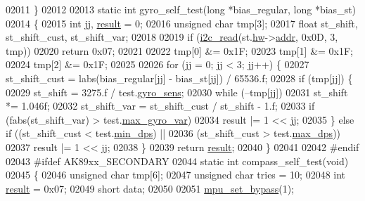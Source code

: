 \begin{DoxyCode}
{{{{{{{02011 \}
02012 
02013 \textcolor{keyword}{static} \textcolor{keywordtype}{int} gyro\_self\_test(\textcolor{keywordtype}{long} *bias\_regular, \textcolor{keywordtype}{long} *bias\_st)
02014 \{
02015     \textcolor{keywordtype}{int} jj, \hyperlink{sensor_8h_a4c9d9cb8bb9d2b707a152051408f40e5}{result} = 0;
02016     \textcolor{keywordtype}{unsigned} \textcolor{keywordtype}{char} tmp[3];
02017     \textcolor{keywordtype}{float} st\_shift, st\_shift\_cust, st\_shift\_var;
02018 
02019     \textcolor{keywordflow}{if} (\hyperlink{_i2_c_8c_ac2d47e7a6c76f93f9b537c31a2986e7b}{i2c\_read}(st.\hyperlink{structgyro__state__s_a5bac30a96752691e4cc723735060e360}{hw}->\hyperlink{structhw__s_a4c34a946600e9d68b6355d23f54d291b}{addr}, 0x0D, 3, tmp))
02020         \textcolor{keywordflow}{return} 0x07;
02021 
02022     tmp[0] &= 0x1F;
02023     tmp[1] &= 0x1F;
02024     tmp[2] &= 0x1F;
02025 
02026     \textcolor{keywordflow}{for} (jj = 0; jj < 3; jj++) \{
02027         st\_shift\_cust = labs(bias\_regular[jj] - bias\_st[jj]) / 65536.f;
02028         \textcolor{keywordflow}{if} (tmp[jj]) \{
02029             st\_shift = 3275.f / test.\hyperlink{structtest__s_a32da1174cf6569aa99bdff70055bb45a}{gyro\_sens};
02030             \textcolor{keywordflow}{while} (--tmp[jj])
02031                 st\_shift *= 1.046f;
02032             st\_shift\_var = st\_shift\_cust / st\_shift - 1.f;
02033             \textcolor{keywordflow}{if} (fabs(st\_shift\_var) > test.\hyperlink{structtest__s_a629a75454f5af8caaff2fe8388975d32}{max\_gyro\_var})
02034                 result |= 1 << jj;
02035         \} \textcolor{keywordflow}{else} \textcolor{keywordflow}{if} ((st\_shift\_cust < test.\hyperlink{structtest__s_a73ee82e1de6d3bdc4cc37282c012f0e1}{min\_dps}) ||
02036             (st\_shift\_cust > test.\hyperlink{structtest__s_a9085b0647fbd57e7ed8e0c4371ad1de2}{max\_dps}))
02037             result |= 1 << jj;
02038     \}
02039     \textcolor{keywordflow}{return} \hyperlink{sensor_8h_a4c9d9cb8bb9d2b707a152051408f40e5}{result};
02040 \}
02041 
02042 \textcolor{preprocessor}{#endif}
02043 \textcolor{preprocessor}{#ifdef AK89xx\_SECONDARY}
02044 \textcolor{keyword}{static} \textcolor{keywordtype}{int} compass\_self\_test(\textcolor{keywordtype}{void})
02045 \{
02046     \textcolor{keywordtype}{unsigned} \textcolor{keywordtype}{char} tmp[6];
02047     \textcolor{keywordtype}{unsigned} \textcolor{keywordtype}{char} tries = 10;
02048     \textcolor{keywordtype}{int} \hyperlink{sensor_8h_a4c9d9cb8bb9d2b707a152051408f40e5}{result} = 0x07;
02049     \textcolor{keywordtype}{short} data;
02050 
02051     \hyperlink{group___d_r_i_v_e_r_s_ga36f70f38371b48d81094d3b061233e15}{mpu\_set\_bypass}(1);
}}}}}}}
\end{DoxyCode}
